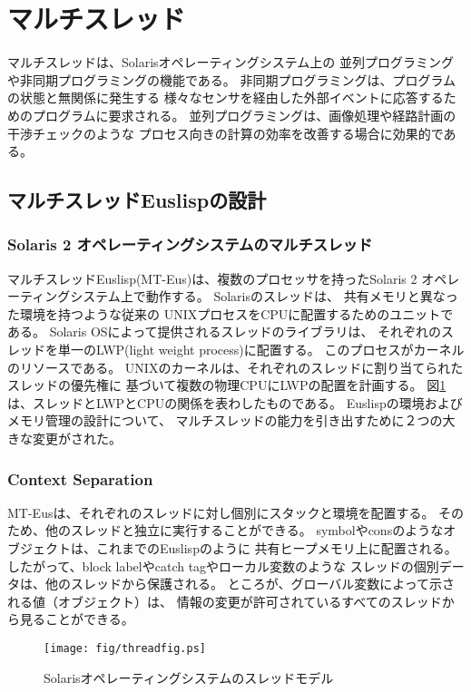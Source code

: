 \newpage
\section{マルチスレッド\label{mthread}}

マルチスレッドは、Solarisオペレーティングシステム上の
並列プログラミングや非同期プログラミングの機能である。
非同期プログラミングは、プログラムの状態と無関係に発生する
様々なセンサを経由した外部イベントに応答するためのプログラムに要求される。
並列プログラミングは、画像処理や経路計画の干渉チェックのような
プロセス向きの計算の効率を改善する場合に効果的である。

\subsection{マルチスレッドEuslispの設計}
\subsubsection{ Solaris 2 オペレーティングシステムのマルチスレッド}
マルチスレッドEuslisp(MT-Eus)は、複数のプロセッサを持ったSolaris 2 
オペレーティングシステム上で動作する。
Solarisのスレッドは、 共有メモリと異なった環境を持つような従来の
UNIXプロセスをCPUに配置するためのユニットである。%
Solaris OSによって提供されるスレッドのライブラリは、
それぞれのスレッドを単一のLWP(light weight process)に配置する。
このプロセスがカーネルのリソースである。
UNIXのカーネルは、それぞれのスレッドに割り当てられたスレッドの優先権に
基づいて複数の物理CPUにLWPの配置を計画する。
図\ref{threadmodel}は、スレッドとLWPとCPUの関係を表わしたものである。
Euslispの環境およびメモリ管理の設計について、
マルチスレッドの能力を引き出すために２つの大きな変更がされた。

\subsubsection{Context Separation}
MT-Eusは、それぞれのスレッドに対し個別にスタックと環境を配置する。
そのため、他のスレッドと独立に実行することができる。
symbolやconsのようなオブジェクトは、これまでのEuslispのように
共有ヒープメモリ上に配置される。
したがって、block labelやcatch tagやローカル変数のような
スレッドの個別データは、他のスレッドから保護される。
ところが、グローバル変数によって示される値（オブジェクト）は、
情報の変更が許可されているすべてのスレッドから見ることができる。

\begin{figure}[b]
\begin{center}
\texttt{[image: fig/threadfig.ps]}
\caption{Solarisオペレーティングシステムのスレッドモデル}\label{threadmodel}
\end{center}
\end{figure}


